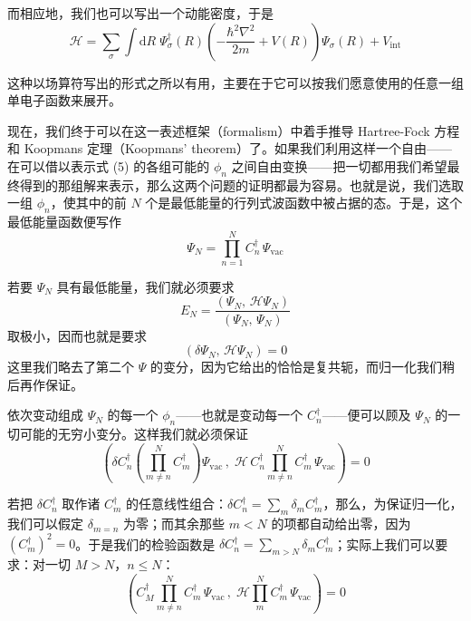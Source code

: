 
而相应地，我们也可以写出一个动能密度，于是
\begin{equation*}
\mathcal{H} = \sum_{\sigma} \int \mathrm{d}R\;\Psi_{\sigma}^{\dagger}(R)\left(-\frac{\hbar^2\nabla^2}{2m} + V(R)\right)\Psi_{\sigma}(R) + V_{\mathrm{int}}
\tag{5}
\end{equation*}

这种以场算符写出的形式之所以有用，主要在于它可以按我们愿意使用的任意一组单电子函数来展开。

现在，我们终于可以在这一表述框架（formalism）中着手推导 Hartree-Fock 方程和 Koopmans 定理（Koopmans' theorem）了。如果我们利用这样一个自由——在可以借以表示式 (5) 的各组可能的 $\phi_n$ 之间自由变换——把一切都用我们希望最终得到的那组解来表示，那么这两个问题的证明都最为容易。也就是说，我们选取一组 $\phi_n$，使其中的前 $N$ 个是最低能量的行列式波函数中被占据的态。于是，这个最低能量函数便写作
\begin{equation*}
\Psi_N = \prod_{n=1}^{N} C_n^{\dagger}\,\Psi_{\mathrm{vac}}
\end{equation*}

若要 $\Psi_N$ 具有最低能量，我们就必须要求
\begin{equation*}
E_N = \frac{\left(\Psi_N,\, \mathcal{H}\Psi_N\right)}{\left(\Psi_N,\, \Psi_N\right)}
\end{equation*}
取极小，因而也就是要求
\begin{equation*}
\left(\delta\Psi_N,\, \mathcal{H}\Psi_N\right) = 0
\end{equation*}
这里我们略去了第二个 $\Psi$ 的变分，因为它给出的恰恰是复共轭，而归一化我们稍后再作保证。

依次变动组成 $\Psi_N$ 的每一个 $\phi_n$——也就是变动每一个 $C_n^{\dagger}$——便可以顾及 $\Psi_N$ 的一切可能的无穷小变分。这样我们就必须保证
\begin{equation*}
\left(\delta C_n^{\dagger}\left(\prod_{m\neq n}^{N} C_m^{\dagger}\right)\Psi_{\mathrm{vac}}\,,\; \mathcal{H}\, C_n^{\dagger} \prod_{m\neq n}^{N} C_m^{\dagger}\,\Psi_{\mathrm{vac}}\right) = 0
\end{equation*}

若把 $\delta C_n^{\dagger}$ 取作诸 $C_m^{\dagger}$ 的任意线性组合：$\delta C_n^{\dagger} = \sum_m \delta_m C_m^{\dagger}$，那么，为保证归一化，我们可以假定 $\delta_{m=n}$ 为零；而其余那些 $m < N$ 的项都自动给出零，因为 $(C_m^{\dagger})^2 = 0$。于是我们的检验函数是 $\delta C_n^{\dagger} = \sum_{m>N} \delta_m C_m^{\dagger}$；实际上我们可以要求：对一切 $M > N$，$n \leq N$：
\begin{equation*}
\left(C_M^{\dagger} \prod_{m\neq n}^{N} C_m^{\dagger}\,\Psi_{\mathrm{vac}}\,,\; \mathcal{H} \prod_{m}^{N} C_m^{\dagger}\,\Psi_{\mathrm{vac}}\right) = 0
\tag{6}
\end{equation*}

